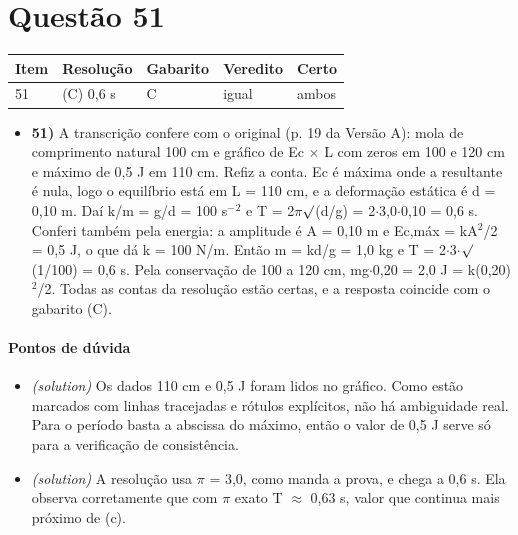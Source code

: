 \documentclass{article}%
\begin{document}
\section*{Questão 51}%
\begin{longtable}{@{}p{} p{} p{} p{} p{}@{}}\toprule Item & Resolução & Gabarito & Veredito & Certo \\ \midrule
51 & (C) 0,6 s & C & igual & ambos \\
\bottomrule\end{longtable}%
\begin{itemize}%
\item%
\textbf{51)} A transcrição confere com o original (p. 19 da Versão A): mola de comprimento natural 100 cm e gráfico de Ec $\times$ L com zeros em 100 e 120 cm e máximo de 0,5 J em 110 cm. Refiz a conta. Ec é máxima onde a resultante é nula, logo o equilíbrio está em L = 110 cm, e a deformação estática é d = 0,10 m. Daí k/m = g/d = 100 s$^{-}$$^2$ e T = 2$\pi$$\surd$(d/g) = 2$\cdot$3,0$\cdot$0,10 = 0,6 s. Conferi também pela energia: a amplitude é A = 0,10 m e Ec,máx = kA$^2$/2 = 0,5 J, o que dá k = 100 N/m. Então m = kd/g = 1,0 kg e T = 2$\cdot$3$\cdot$$\surd$(1/100) = 0,6 s. Pela conservação de 100 a 120 cm, mg$\cdot$0,20 = 2,0 J = k(0,20)$^2$/2. Todas as contas da resolução estão certas, e a resposta coincide com o gabarito (C).%
\end{itemize}%
\paragraph{Pontos de dúvida}%
\begin{itemize}%
\item%
\textit{(solution)} Os dados 110 cm e 0,5 J foram lidos no gráfico. Como estão marcados com linhas tracejadas e rótulos explícitos, não há ambiguidade real. Para o período basta a abscissa do máximo, então o valor de 0,5 J serve só para a verificação de consistência.%
\item%
\textit{(solution)} A resolução usa $\pi$ = 3,0, como manda a prova, e chega a 0,6 s. Ela observa corretamente que com $\pi$ exato T $\approx$ 0,63 s, valor que continua mais próximo de (c).%
\end{itemize}%
\end{document}
